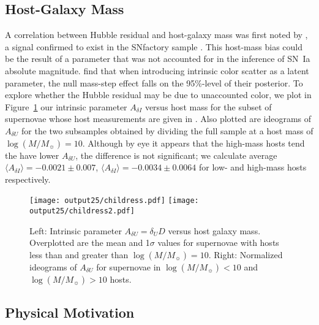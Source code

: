 \documentclass{aastex61}   	%
\begin{document}
\subsection{Host-Galaxy Mass}
A correlation between Hubble residual and host-galaxy mass
was first noted by \citet{2010ApJ...715..743K,2010MNRAS.406..782S}, a signal confirmed to exist in the SNfactory
sample \citep{2013ApJ...770..108C}.
This host-mass bias could be the result of a parameter that was not accounted for in the inference of SN~Ia absolute magnitude.
\citet{2016arXiv160904470M} find that when introducing intrinsic color scatter as a latent parameter, the null mass-step effect falls on the 95\%-level of their posterior.
To explore whether the Hubble residual may be due to unaccounted color,
we plot in Figure~\ref{childress:fig} our intrinsic parameter  $A_{\delta I}$  versus host mass 
\color{purple}
for the subset of supernovae whose host measurements are given in \citet{2013ApJ...770..108C}.
Also plotted  are ideograms of $A_{\delta U}$ for the two subsamples obtained by dividing the full sample at a host mass of  $\log{(M/M_\sun)}=10$.
Although by eye it appears that the high-mass hosts tend the have lower $A_{\delta U}$, the difference is
not significant; we calculate  average
$\langle A_{\delta I} \rangle=   -0.0021 \pm    0.007$,
$\langle A_{\delta I} \rangle= -0.0034 \pm    0.0064$ 
for low- and high-mass hosts respectively. 

\begin{figure}[htbp] %
   \centering
   \texttt{[image: output25/childress.pdf]}
   \texttt{[image: output25/childress2.pdf]}
      \caption{Left: Intrinsic parameter $A_{\delta U}=\delta_U D$  versus host galaxy mass. Overplotted are the mean and 1$\sigma$ values for supernovae with hosts
      less than and greater than  $\log{(M/M_\sun)}=10$.
Right: Normalized ideograms of  $A_{\delta U}$ for supernovae in $\log{(M/M_\sun)}<10$ and $\log{(M/M_\sun)}>10$ hosts. 
   \label{childress:fig}}
\end{figure}

\color{black}
\subsection{Physical Motivation}
\end{document}
